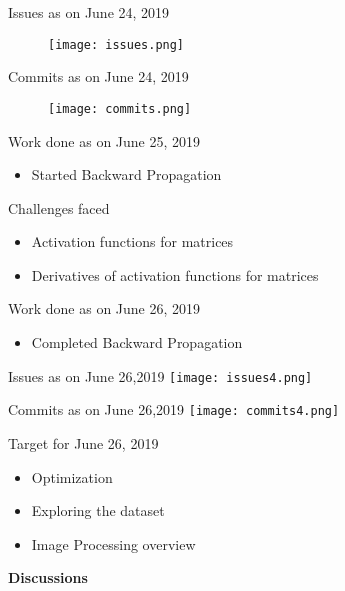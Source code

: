 \documentclass{beamer}
\begin{document}
\begin{frame}{Issues as on June 24, 2019}
    \begin{figure}
        \centering
        \texttt{[image: issues.png]}
    \end{figure}
\end{frame}
    
\begin{frame}{Commits as on June 24, 2019}
    \begin{figure}
        \centering
        \texttt{[image: commits.png]}
    \end{figure}
\end{frame}

\begin{frame}{Work done as on June 25, 2019}
    \begin{itemize}
        \item Started Backward Propagation
    \end{itemize}
\end{frame}

\begin{frame}{Challenges faced}
    \begin{itemize}
        \item  Activation functions for matrices
        \vspace{10pt}
        \item  Derivatives of activation functions for matrices
    \end{itemize}
\end{frame}

\begin{frame}{Work done as on June 26, 2019}
    \begin{itemize}
        \item Completed Backward Propagation 
    \end{itemize}
\end{frame}

\begin{frame}{Issues as on June 26,2019}
\texttt{[image: issues4.png]}
\end{frame}

\begin{frame}{Commits as on June 26,2019}
\texttt{[image: commits4.png]}
\end{frame}

\begin{frame}{Target for June 26, 2019}
\begin{itemize}
    \item Optimization 
    \vspace{10pt}
    \item Exploring the dataset
    \vspace{10pt}
    \item Image Processing overview
\end{itemize}
\end{frame}

\begin{frame}{}
  \centering \Large
  \color{blue}
  \textbf {Discussions}
\end{frame}
\end{document}
